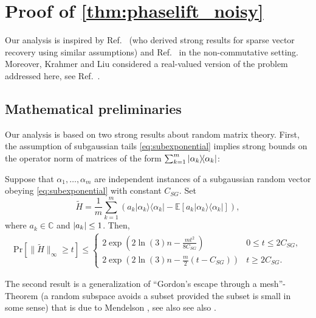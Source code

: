 \section{Proof of \cref{thm:phaselift_noisy}}
\label{sec:main_proof}

Our analysis is inspired by Ref.~\cite{dirksen_gap_2015} (who derived strong results for sparse vector recovery using similar assumptions) and Ref.~\cite{kabanava_stable_2016} in the non-commutative setting. Moreover, Krahmer and Liu considered a real-valued version of the problem addressed here, see Ref.~\cite{krahmer_phase_2017}.




\subsection{Mathematical preliminaries}

Our analysis is based on two strong results about random matrix theory. First, the assumption of subgaussian tails \eqref{eq:subexponential} implies strong bounds on the operator norm of matrices of the form $\sum_{k=1}^m \ket{{\alpha_k}}\bra{\alpha_k}$:

\begin{theorem} \label{thm:bernstein}
Suppose that $\alpha_1,\ldots,\alpha_m$ are independent instances of a subgaussian random vector obeying \eqref{eq:subexponential} with constant $C_{SG}$.
Set
\[
  \tilde{H} = \frac{1}{m} \sum_{k=1}^m \left( a_k |\alpha_k \rangle \! \langle \alpha_k| - \mathbb{E} \left[ a_k |\alpha_k \rangle \! \langle \alpha_k| \right] \right),
  \label{eq:Htilde}
\]
where $a_k \in \mathbb{C}$ and ${\vert a_k\vert} \leq 1$.
Then,
\begin{align*}
\mathrm{Pr} \left[ \| \tilde{H} \|_\infty \geq t \right]
\leq
\begin{cases}
2 \exp \left( 2 \ln (3) n  - \frac{mt^2}{8 C_{SG}} \right) & 0 \leq t \leq 2C_{SG}, \\
2 \exp \left( 2 \ln (3) n - \frac{m}{2} (t- C_{SG} )  \right) & t \geq 2 C_{SG}.
\end{cases}
\end{align*}
\end{theorem}


The second result is a generalization of ``Gordon's escape through a mesh''-Theorem \cite{gordon_milman_1988} (a random subspace avoids a subset provided the subset is small in some sense) that is due to Mendelson \cite{mendelson_learning_2015,koltchinskii_bounding_2015}, see also see also \cite{tropp_convex_2015}.

